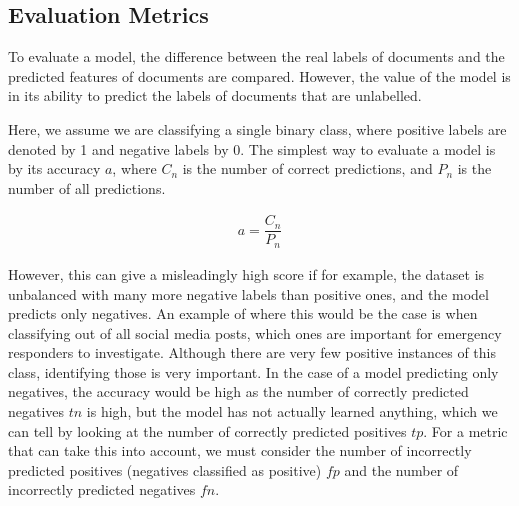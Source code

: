 
\subsection{Evaluation Metrics}\label{bg:metrics}

To evaluate a model, the difference between the real labels of documents and the predicted features of documents are compared. However, the value of the model is in its ability to predict the labels of documents that are unlabelled. 

Here, we assume we are classifying a single binary class, where positive labels are denoted by 1 and negative labels by 0. The simplest way to evaluate a model is by its accuracy $a$, where ${C_n}$ is the number of correct predictions, and $P_n$ is the number of all predictions.

\begin{align}
a = \dfrac{C_n}{ P_n}  
\end{align}

However, this can give a misleadingly high score if for example, the dataset is unbalanced with many more negative labels than positive ones, and the model predicts only negatives. An example of where this would be the case is when classifying out of all social media posts, which ones are important for emergency responders to investigate. Although there are very few positive instances of this class, identifying those is very important. In the case of a model predicting only negatives, the accuracy would be high as the number of correctly predicted negatives $\textit{tn}$ is high, but the model has not actually learned anything, which we can tell by looking at the number of correctly predicted positives $\textit{tp}$. For a metric that can take this into account, we must consider the number of incorrectly predicted positives (negatives classified as positive) $\textit{fp}$ and the number of incorrectly predicted negatives $\textit{fn}$.

